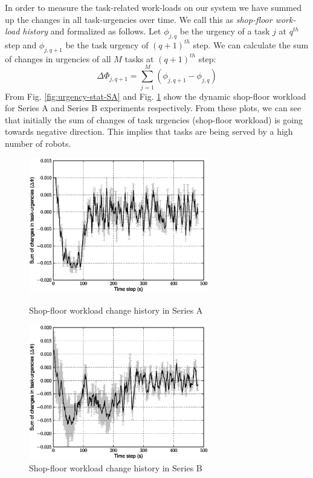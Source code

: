 \documentclass[smallcondensed]{svjour3}
\begin{document}
In order to measure the task-related work-loads on our system we have summed up the changes in all task-urgencies over time. We call this as {\em shop-floor work-load history} and formalized as follows. Let $ \phi_{j, q}$ be the urgency of a task $j$ at $q^{th}$ step and $\phi_{j, q+1}$ be the task urgency of $(q+1)^{th}$ step. We can calculate the sum of changes in urgencies of all $M$ tasks at $(q+1)^{th}$ step:
\begin{equation} 
\Delta \Phi_{j, q+1} = \sum_{j=1}^{M} (\phi_{j, q+1} - \phi_{j, q})
\label{eqn:Delta-Phi}
\end{equation}
From Fig. \ref{fig:urgency-stat-SA} and Fig. \ref{fig:urgency-stat-SB} show the dynamic shop-floor workload for Series A and Series B experiments respectively. From these plots, we can see that initially the sum of changes of task urgencies (shop-floor workload) is going towards negative direction. This implies that tasks are being served by a high number of robots. 
\begin{figure}
\centering
\includegraphics[width=0.7\textwidth, angle=0]
{images/global-8robots/8robots2tasks-TaskUrgencyStat.eps}
\caption{\small Shop-floor workload change history in Series A} 
\label{fig:urgency-stat-SA} %
\centering
\includegraphics[width=0.7\textwidth, angle=0]{images/TaskUrgencyStat.eps}
\caption{\small Shop-floor workload change history in Series B} %
\label{fig:urgency-stat-SB} %
\end{figure}
\end{document}
